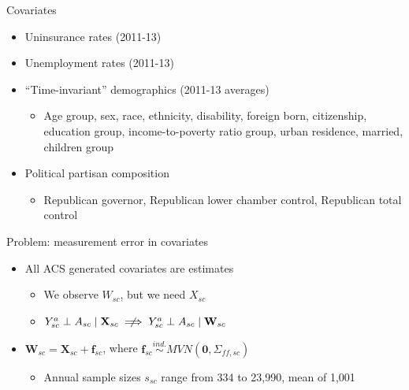\documentclass[hyperref={pdfpagelabels=false}]{beamer}
\begin{document}
\begin{frame}{Covariates}
\begin{itemize}
    \item Uninsurance rates (2011-13) \bigskip
    \item Unemployment rates (2011-13) \bigskip
    \item ``Time-invariant'' demographics (2011-13 averages) \bigskip
    \begin{itemize}
        \item Age group, sex, race, ethnicity, disability, foreign born, citizenship, education group, income-to-poverty ratio group, urban residence, married, children group \bigskip
    \end{itemize}
    \item Political partisan composition \bigskip
    \begin{itemize}
        \item Republican governor, Republican lower chamber control, Republican total control
    \end{itemize}
\end{itemize}
\end{frame}

\begin{frame}{Problem: measurement error in covariates}
    \begin{itemize}
        \item All ACS generated covariates are estimates \bigskip
        \begin{itemize}
            \item We observe $W_{sc}$, but we need $X_{sc}$ \bigskip
            \item $Y_{sc}^a \perp A_{sc} \mid \mathbf{X}_{sc} \centernot\implies Y_{sc}^a \perp A_{sc} \mid \mathbf{W}_{sc}$ \bigskip
        \end{itemize}
        \item $\mathbf{W}_{sc} = \mathbf{X}_{sc} + \mathbf{f}_{sc}$, where $\mathbf{f}_{sc} \stackrel{ind.}\sim MVN(\mathbf{0}, \Sigma_{ff, sc})$ \bigskip
        \begin{itemize}
            \item Annual sample sizes $s_{sc}$ range from 334 to 23,990, mean of 1,001 \bigskip
        \end{itemize}
    \end{itemize}
\end{frame}
\end{document}
